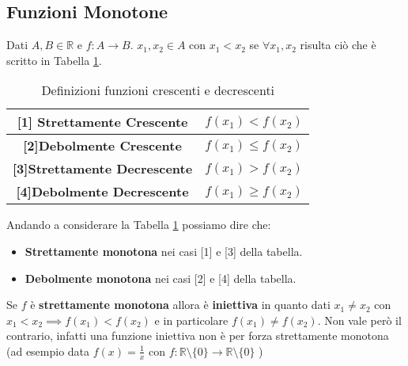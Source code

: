 \subsection{Funzioni Monotone}
\begin{definition}[Monotone]
Dati $A, B \in \mathbb{R}$ e $f:A \longrightarrow B$. $x_1, x_2 \in A$ con $x_1 < x_2$ se $\forall x_1, x_2$ risulta ciò che è scritto in Tabella \ref{tab:monotone}.
\end{definition}
\begin{table}[h!]
    \centering
    \setlength{\tabcolsep}{6pt}
    \renewcommand{\arraystretch}{1.7}
    \begin{tabular}{|c|c|}
        \hline
        \textbf{[1] Strettamente Crescente} & $f(x_1) < f(x_2) $ \\ \hline
        \textbf{[2]Debolmente Crescente} & $f(x_1) \leq f(x_2) $ \\ \hline
        \textbf{[3]Strettamente Decrescente} & $f(x_1) > f(x_2) $ \\ \hline
        \textbf{[4]Debolmente Decrescente} & $f(x_1) \geq f(x_2) $ \\ \hline
    \end{tabular}
    \caption{Definizioni funzioni crescenti e decrescenti}
    \label{tab:monotone}
\end{table}
Andando a considerare la Tabella \ref{tab:monotone} possiamo dire che:
\begin{itemize}
    \item \textbf{Strettamente monotona} nei casi [1] e [3] della tabella.
    \item \textbf{Debolmente monotona} nei casi [2] e [4] della tabella.
\end{itemize}

\begin{observation}
	Se $f$ è \textbf{strettamente monotona} allora è \textbf{iniettiva} in quanto dati $x_{1} \neq x_{2}$ con $x_{1} < x_{2} \implies f(x_{1}) < f(x_{2})$ e in particolare $f(x_{1}) \neq f(x_{2})$. Non vale però il contrario, infatti una funzione iniettiva non è per forza strettamente monotona (ad esempio data $f(x)=\frac{1}{x}$ con $f:\mathbb{R} \setminus \{0\} \longrightarrow \mathbb{R} \setminus \{0\}$ )
\end{observation}

